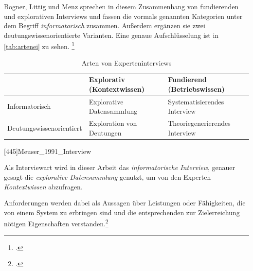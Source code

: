 Bogner, Littig und Menz sprechen in diesem Zusammenhang von fundierenden und explorativen Interviews und fassen die vormals genannten Kategorien unter dem Begriff \textit{informatorisch} zusammen. Außerdem ergänzen sie zwei  deutungswissenorientierte Varianten. Eine genaue Aufschlüsselung ist in \autoref{tab:artenei} zu sehen.
\footcites[Vgl.][22\psqq]{Bogner_2014_Interview}[Vgl.][445\psq]{Meuser_1991_Interview}


\begin{table}[H]
\centering
\begin{tabularx}{1\textwidth}{l|X|X}
                            & Explorativ (Kontextwissen) & Fundierend (Betriebswissen) \\\hline
   Informatorisch           & Explorative Datensammlung & Systematisierendes Interview \\
   Deutungswissenorientiert & Exploration von Deutungen & Theoriegenerierendes Interview\\
\end{tabularx}
  [445\psqq]{Meuser_1991_Interview}
\caption{Arten von Experteninterviews}
\label{tab:artenei}
\end{table}




 Als Interviewart wird in dieser Arbeit das \textit{informatorische Interview}, genauer gesagt die \textit{explorative Datensammlung} genutzt, um von den Experten \textit{Kontextwissen} abzufragen.

Anforderungen werden dabei als Aussagen über Leistungen oder Fähigkeiten, die von einem System zu erbringen sind und die entsprechenden zur Zielerreichung nötigen Eigenschaften verstanden.\footcite[Vgl.][3]{Pohl_2015_Requirements}

